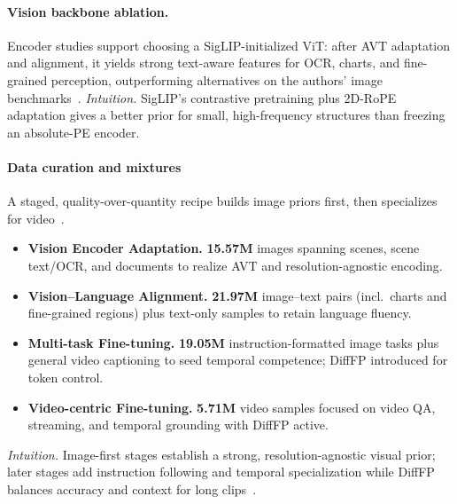 \begin{enrichment}
\begin{enrichment}
        \paragraph{Vision backbone ablation.}
        Encoder studies support choosing a SigLIP\mbox{-}initialized ViT: after AVT adaptation and alignment, it yields strong text\mbox{-}aware features for OCR, charts, and fine\mbox{-}grained perception, outperforming alternatives on the authors’ image benchmarks~\cite[Sec.~4.4]{zhai2023_siglip,zhang2025_videollama3}. \emph{Intuition.} SigLIP’s contrastive pretraining plus 2D\mbox{-}RoPE adaptation gives a better prior for small, high\mbox{-}frequency structures than freezing an absolute\mbox{-}PE encoder.
        
        \newpage
        
        \paragraph{Data curation and mixtures}
        A staged, quality\mbox{-}over\mbox{-}quantity recipe builds image priors first, then specializes for video~\cite[Sec.~3.2; Tables~1--4]{zhang2025_videollama3}.
        \begin{itemize}
            \item \textbf{Vision Encoder Adaptation.} \textbf{15.57M} images spanning scenes, scene text/OCR, and documents to realize AVT and resolution\mbox{-}agnostic encoding.
            \item \textbf{Vision\mbox{--}Language Alignment.} \textbf{21.97M} image\mbox{--}text pairs (incl.\ charts and fine\mbox{-}grained regions) plus text\mbox{-}only samples to retain language fluency.
            \item \textbf{Multi\mbox{-}task Fine\mbox{-}tuning.} \textbf{19.05M} instruction\mbox{-}formatted image tasks plus general video captioning to seed temporal competence; DiffFP introduced for token control.
            \item \textbf{Video\mbox{-}centric Fine\mbox{-}tuning.} \textbf{5.71M} video samples focused on video QA, streaming, and temporal grounding with DiffFP active.
        \end{itemize}
        \emph{Intuition.} Image\mbox{-}first stages establish a strong, resolution\mbox{-}agnostic visual prior; later stages add instruction following and temporal specialization while DiffFP balances accuracy and context for long clips~\cite[Sec.~3.2; Sec.~4.5]{zhang2025_videollama3}.
        

\end{enrichment}
\end{enrichment}
